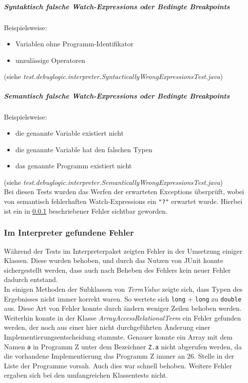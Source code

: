 \documentclass[parskip=full]{scrartcl}
\begin{document}
\subparagraph{Syntaktisch falsche Watch-Expressions oder Bedingte Breakpoints}
Beispielsweise:
\begin{itemize}
\item Variablen ohne Programm-Identifikator
\item unzulässige Operatoren
\end{itemize}
(siehe \textit{test.debuglogic.interpreter.SyntacticallyWrongExpressionsTest.java})\\

\subparagraph{Semantisch falsche Watch-Expressions oder Bedingte Breakpoints}
Beispielsweise:
\begin{itemize}
\item die genannte Variable existiert nicht
\item die genannte Variable hat den falschen Typen
\item das genannte Programm existiert nicht
\end{itemize}
(siehe \textit{test.debuglogic.interpreter.SemanticallyWrongExpressionsTest.java})\\
Bei diesen Tests wurden das Werfen der erwarteten Exceptions überprüft, wobei von semantisch fehlerhaften Watch-Expressions ein \texttt{"?"} erwartet wurde. Hierbei ist ein in \ref{fehlerImInterpreter} beschriebener Fehler sichtbar geworden.

\subsubsection{Im Interpreter gefundene Fehler}\label{fehlerImInterpreter}
Während der Tests im Interpreterpaket zeigten Fehler in der Umsetzung einiger Klassen. Diese wurden behoben, und durch das Nutzen von JUnit konnte sichergestellt werden, dass auch nach Beheben des Fehlers kein neuer Fehler dadurch entstand.\\
In einigen Methoden der Subklassen von \textit{TermValue} zeigte sich, dass Typen des Ergebnisses nicht immer korrekt waren. So wertete sich \texttt{long} + \texttt{long} zu \texttt{double} aus. Diese Art von Fehler konnte durch ändern weniger Zeilen behoben werden.\\
Weiterhin konnte in der Klasse \textit{ArrayAccessRelationalTerm} ein Fehler gefunden werden, der noch aus einer hier nicht durchgeführten Änderung einer Implementierungsentscheidung stammte. Genauer konnte ein Array mit dem Namen \texttt{a} in Programm Z unter dem Bezeichner \texttt{Z.a} nicht abgerufen werden, da die vorhandene Implementierung das Programm Z immer an 26. Stelle in der Liste der Programme vorsah. Auch dies war schnell behoben. Weitere Fehler ergaben sich bei den umfangreichen Klassentests nicht. \\
\end{document}
